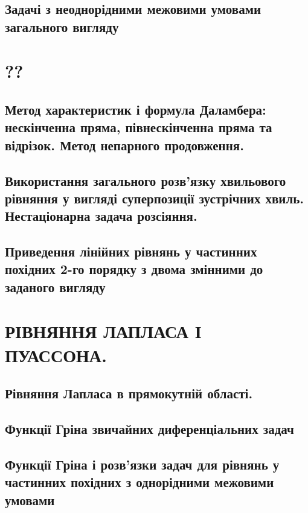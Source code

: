 \documentclass[a4paper, 14pt]{extreport}
\begin{document}
\chapter{Задачі з неоднорідними межовими умовами загального вигляду}




\part{??}
\chapter{Метод характеристик і формула Даламбера: нескінченна пряма, півнескінченна пряма та відрізок. Метод непарного продовження.}




\chapter{Використання загального розв’язку хвильового рівняння у вигляді суперпозиції зустрічних хвиль. Нестаціонарна задача розсіяння.}



\chapter{Приведення лінійних рівнянь у частинних похідних 2-го порядку з двома змінними до заданого вигляду}




\part{РІВНЯННЯ ЛАПЛАСА І ПУАССОНА.}

\chapter{Рівняння Лапласа в прямокутній області.}



\chapter{Функції Гріна звичайних диференціальних задач}




\chapter{Функції Гріна і розв’язки задач для рівнянь у частинних похідних з однорідними межовими умовами}



\end{document}
